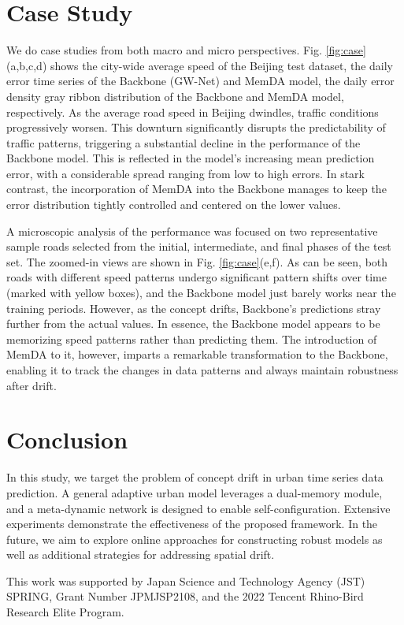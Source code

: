 \documentclass[sigconf]{acmart}
\begin{document}
\section{Case Study}

We do case studies from both macro and micro perspectives. Fig. \ref{fig:case} (a,b,c,d) shows the city-wide average speed of the Beijing test dataset, the daily error time series of the Backbone (GW-Net) and MemDA model, the daily error density gray ribbon distribution of the Backbone and MemDA model, respectively. As the average road speed in Beijing dwindles, traffic conditions progressively worsen. This downturn significantly disrupts the predictability of traffic patterns, triggering a substantial decline in the performance of the Backbone model. This is reflected in the model's increasing mean prediction error, with a considerable spread ranging from low to high errors. In stark contrast, the incorporation of MemDA into the Backbone manages to keep the error distribution tightly controlled and centered on the lower values.

A microscopic analysis of the performance was focused on two representative sample roads selected from the initial, intermediate, and final phases of the test set. The zoomed-in views are shown in Fig. \ref{fig:case}(e,f). As can be seen, both roads with different speed patterns undergo significant pattern shifts over time (marked with yellow boxes), and the Backbone model just barely works near the training periods. However, as the concept drifts, Backbone's predictions stray further from the actual values. In essence, the Backbone model appears to be memorizing speed patterns rather than predicting them. The introduction of MemDA to it, however, imparts a remarkable transformation to the Backbone, enabling it to track the changes in data patterns and always maintain robustness after drift.

\section{Conclusion}
In this study, we target the problem of concept drift in urban time series data prediction. A general adaptive urban model leverages a dual-memory module, and a meta-dynamic network is designed to enable self-configuration. Extensive experiments demonstrate the effectiveness of the proposed framework. In the future, we aim to explore online approaches for constructing robust models as well as additional strategies for addressing spatial drift.

\begin{acks}
This work was supported by Japan Science and Technology Agency (JST) SPRING, Grant Number JPMJSP2108, and the 2022 Tencent Rhino-Bird Research Elite Program.
\end{acks}



\end{document}
